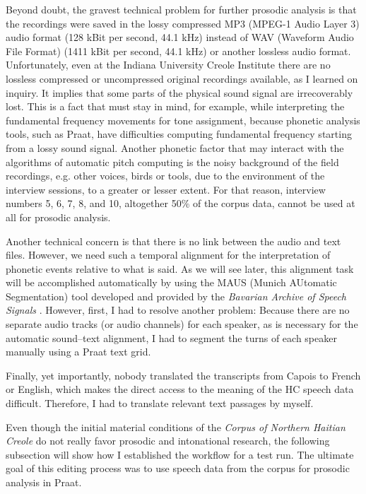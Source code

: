 \documentclass[output=paper]{langsci/langscibook}
\begin{document}
Beyond doubt, the gravest technical problem for further prosodic analysis is that the recordings were saved in the lossy compressed MP3 (MPEG-1 Audio Layer 3) audio format (128 kBit per second, 44.1 kHz) instead of WAV (Waveform Audio File Format) (1411 kBit per second, 44.1 kHz) or another lossless audio format. Unfortunately, even at the Indiana University Creole Institute there are no lossless compressed or uncompressed original recordings available, as I learned on inquiry. It implies that some parts of the physical sound signal are irrecoverably lost. This is a fact that must stay in mind, for example, while interpreting the fundamental frequency movements for tone assignment, because phonetic analysis tools, such as Praat, have difficulties computing fundamental frequency starting from a lossy sound signal. Another phonetic factor that may interact with the algorithms of automatic pitch computing is the noisy background of the field recordings, e.g. other voices, birds or tools, due to the environment of the interview sessions, to a greater or lesser extent. For that reason, interview numbers 5, 6, 7, 8, and 10, altogether 50\% of the corpus data, cannot be used at all for prosodic analysis.

Another technical concern is that there is no link between the audio and text files. However, we need such a temporal alignment for the interpretation of phonetic events relative to what is said. As we will see later, this alignment task will be accomplished automatically by using the MAUS (Munich AUtomatic Segmentation) tool developed and provided by the \textit{Bavarian Archive of Speech Signals} \citep{Schiel1999,kisler2017MAUS}. However, first, I had to resolve another problem: Because there are no separate audio tracks (or audio channels) for each speaker, as is necessary for the automatic sound–text alignment, I had to segment the turns of each speaker manually using a Praat text grid. 

Finally, yet importantly, nobody translated the transcripts from Capois to French or English, which makes the direct access to the meaning of the HC speech data difficult. Therefore, I had to translate relevant text passages by myself.

Even though the initial material conditions of the \textit{Corpus of Northern Haitian Creole} do not really favor prosodic and intonational research, the following subsection will show how I established the workflow for a test run. The ultimate goal of this editing process was to use speech data from the corpus for prosodic analysis in Praat. 
\end{document}
